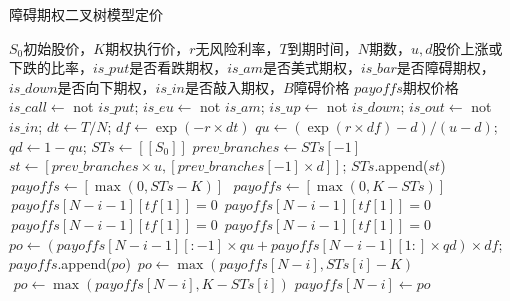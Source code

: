 \documentclass[11pt]{ctexart}
\begin{document}
    \begin{algorithm}
        \caption{障碍期权二叉树模型定价}
        \begin{algorithmic}[1] %
            \Require $S_0$初始股价，$K$期权执行价，$r$无风险利率，$T$到期时间，$N$期数，$u,d$股价上涨或下跌的比率，$is\_put$是否看跌期权，$is\_am$是否美式期权，$is\_bar$是否障碍期权，$is\_down$是否向下期权，$is\_in$是否敲入期权，$B$障碍价格
            \Ensure $payoffs$期权价格
                \State $is\_call \gets$ not $is\_put$; $is\_eu \gets$ not $is\_am$;
                \State $is\_up \gets$ not $is\_down$; $is\_out \gets$ not $is\_in$;
                \State $dt \gets T/N$; $df \gets \exp(-r \times dt)$
            \EndFunction
            \State
                \State $qu \gets (\exp(r \times df) - d) / (u-d)$; $qd \gets 1-qu$; $STs \gets [[S_0]]$
                    \State $prev\_branches \gets STs[-1]$
                    \State $st \gets [prev\_branches \times u, [prev\_branches[-1] \times d]]$;  $STs$.append($st$)
                \EndFor
                 $\,payoffs \gets [\max(0, STs - K)]$
                \Else $\,\,payoffs \gets [\max(0, K - STs)]$
                \EndIf
                             $\,payoffs[N-i-1][tf[1]] = 0$
                             $\,payoffs[N-i-1][tf[1]] = 0$
                             $\,payoffs[N-i-1][tf[1]] = 0$
                             $\,payoffs[N-i-1][tf[1]] = 0$
                            \EndIf
                        \EndFor
                    \EndIf
                    \State $po \gets (payoffs[N-i-1][:-1]\times qu + payoffs[N-i-1][1:]\times qd) \times df$; $payoffs$.append($po$)
                         $\,po \gets \max(payoffs[N-i], STs[i] - K)$
                        \Else $\,\,po \gets \max(payoffs[N-i], K - STs[i])$
                        \EndIf
                        \State $payoffs[N-i] \gets po$
                    \EndIf
                \EndFor\\
            \EndFunction
        \end{algorithmic}
    \end{algorithm}
\end{document}
